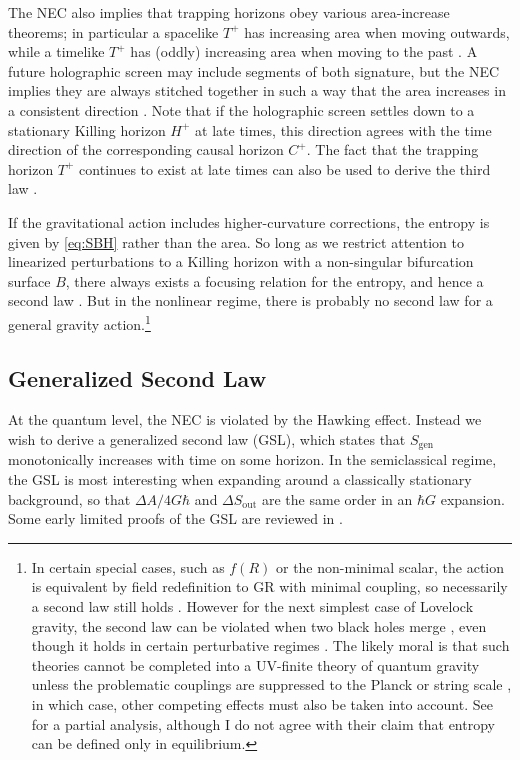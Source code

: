 \documentclass[12pt,a4paper]{article}
\begin{document}
The NEC also implies that trapping horizons obey various area-increase theorems; in particular a spacelike $T^+$ has increasing area when moving outwards, while a timelike $T^+$ has (oddly) increasing area when moving to the past \cite{hayward1994general}.  A future holographic screen may include segments of both signature, but the NEC implies they are always stitched together in such a way that the area increases in a consistent direction \cite{bousso2015new}.  Note that if the holographic screen settles down to a stationary Killing horizon $H^+$ at late times, this direction agrees with the time direction of the corresponding causal horizon $C^+$. The fact that the trapping horizon $T^+$ continues to exist at late times can also be used to derive the third law \cite{israel}. 

If the gravitational action includes higher-curvature corrections, the entropy is given by \eqref{eq:SBH} rather than the area. So long as we restrict attention to linearized perturbations to a Killing horizon with a non-singular bifurcation surface $B$, there always exists a focusing relation for the entropy, and hence a second law \cite{Wall:2015raa, Sarkar:2013swa}.  But in the nonlinear regime, there is probably no second law for a general gravity action.\footnote{In certain special cases, such as $f(R)$ or the non-minimal scalar, the action is equivalent by field redefinition to GR with minimal coupling, so necessarily a second law still holds \cite{Jacobson:1995uq,ford2001classical}. However for the next simplest case of Lovelock gravity, the second law can be violated when two black holes merge \cite{Jacobson:1993xs,Liko:2007vi,Sarkar:2010xp}, even though it holds in certain perturbative regimes \cite{Wall:2015raa, Sarkar:2013swa,Kolekar:2012tq,Bhattacharyya:2016xfs}.  The likely moral is that such theories cannot be completed into a UV-finite theory of quantum gravity unless the problematic couplings are suppressed to the Planck or string scale \cite{camanho2016causality}, in which case, other competing effects must also be taken into account. See \cite{Chatterjee:2013daa} for a partial analysis, although I do not agree with their claim that entropy can be defined only in equilibrium.}

\subsection{Generalized Second Law}

At the quantum level, the NEC is violated by the Hawking effect.  Instead we wish to derive a generalized second law (GSL), which states that $S_{\mathrm{gen}}$ monotonically increases with time on some horizon.  In the semiclassical regime, the GSL is most interesting when expanding around a classically stationary background, so that $\Delta A/4G\hbar$ and $\Delta S_\mathrm{out}$ are the same order in an $\hbar G$ expansion.  Some early limited proofs of the GSL are reviewed in \cite{10proofs}.
\end{document}
